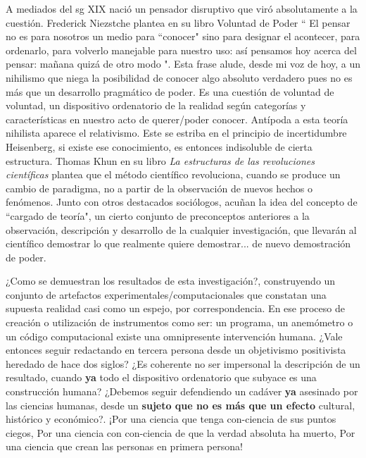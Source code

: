 A mediados del sg XIX nació un pensador disruptivo que viró absolutamente a la cuestión. Frederick Niezstche plantea en su libro Voluntad de Poder \cite{nietzsche2018voluntad} `` El pensar no es para nosotros un medio para ``conocer" sino para designar el acontecer, para ordenarlo, para volverlo manejable para nuestro uso: así pensamos hoy acerca del pensar: mañana quizá de otro modo ". Esta frase alude, desde mi voz de hoy, a un nihilismo que niega la posibilidad de conocer algo absoluto verdadero pues no es más que un desarrollo pragmático de poder. Es una cuestión de voluntad de voluntad, un dispositivo ordenatorio de la realidad según categorías y características en nuestro acto de querer/poder conocer. Antípoda a esta teoría nihilista aparece el relativismo. Este se estriba en el principio de incertidumbre Heisenberg, si existe ese conocimiento, es entonces indisoluble de cierta estructura. Thomas Khun en su libro \emph{La estructuras de las revoluciones científicas} \cite{kuhn2019estructura} plantea que el método científico revoluciona, cuando se produce un cambio de paradigma, no a partir de la observación de nuevos hechos o fenómenos. Junto con otros destacados sociólogos, acuñan la idea del concepto de ``cargado de teoría", un cierto conjunto de preconceptos anteriores a la observación, descripción y desarrollo de la cualquier investigación, que llevarán al científico demostrar lo que realmente quiere demostrar... de nuevo demostración de poder.

¿Como se demuestran los resultados de esta investigación?, construyendo un conjunto de artefactos experimentales/computacionales que constatan una supuesta realidad casi como un espejo, por correspondencia. En ese proceso de creación o utilización de instrumentos como ser: un programa, un anemómetro o un código computacional existe una omnipresente intervención humana. ¿Vale entonces seguir redactando en tercera persona desde un objetivismo positivista heredado de hace dos siglos? ¿Es coherente no ser impersonal la descripción de un resultado, cuando \textbf{ya} todo el dispositivo ordenatorio que subyace es una construcción humana? ¿Debemos seguir defendiendo un cadáver \textbf{ya} asesinado por las ciencias humanas, desde un \textbf{sujeto que no es más que un efecto} cultural, histórico y económico?. ¡Por una ciencia que tenga con-ciencia de sus puntos ciegos, Por una ciencia con con-ciencia de que la verdad absoluta ha muerto, Por una ciencia que crean las personas en primera persona!  


